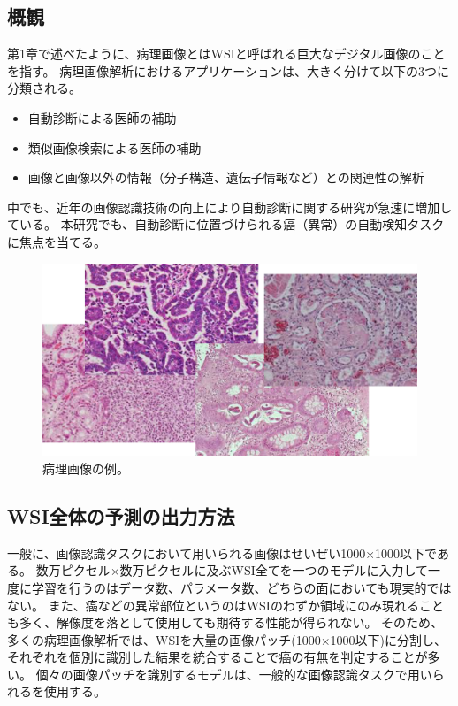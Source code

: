 \subsection{概観}
第1章で述べたように、病理画像とはWSIと呼ばれる巨大なデジタル画像のことを指す。
病理画像解析におけるアプリケーションは、大きく分けて以下の3つに分類される\cite{komuraishikawa}。
\begin{itemize}
    \item 自動診断による医師の補助
    \item 類似画像検索による医師の補助
    \item 画像と画像以外の情報（分子構造、遺伝子情報など）との関連性の解析
\end{itemize}
中でも、近年の画像認識技術の向上により自動診断に関する研究が急速に増加している\cite{doyle2008automated,dundar2011computerized}。
本研究でも、自動診断に位置づけられる癌（異常）の自動検知タスクに焦点を当てる。

\begin{figure}[tbp]
    \label{fig:path_images}
     \begin{center}
      \includegraphics[width=13cm]{figures/path_images.png}
     \end{center}
    \caption{病理画像の例。}
\end{figure}
    
\subsection{WSI全体の予測の出力方法}
一般に、画像認識タスクにおいて用いられる画像はせいぜい1000×1000以下である。
数万ピクセル×数万ピクセルに及ぶWSI全てを一つのモデルに入力して一度に学習を行うのはデータ数、パラメータ数、どちらの面においても現実的ではない。
また、癌などの異常部位というのはWSIのわずか領域にのみ現れることも多く、解像度を落として使用しても期待する性能が得られない。
そのため、多くの病理画像解析では、WSIを大量の画像パッチ(1000×1000以下)に分割し、それぞれを個別に識別した結果を統合することで癌の有無を判定することが多い。
個々の画像パッチを識別するモデルは、一般的な画像認識タスクで用いられるを使用する。

